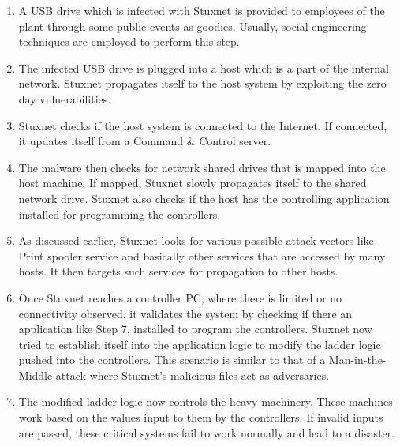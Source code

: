 \documentclass[article,msc=informatik,type=msc,colorback,accentcolor=tud9c]{tudthesis}
\begin{document}
\begin{itemize}
	
	\begin{enumerate}

	

	\item A USB drive which is infected with Stuxnet is provided to employees of the plant through some public events as goodies. Usually, social engineering techniques are employed to perform this step.

	
	\item The infected USB drive is plugged into a host which is a part of the internal network. Stuxnet propagates itself to the host system by exploiting the zero day vulnerabilities.  

	
	\item Stuxnet checks if the host system is connected to the Internet. If connected, it updates itself from a Command \& Control server.

	
	\item The malware then checks for network shared drives that is mapped into the host machine. If mapped, Stuxnet slowly propagates itself to the shared network drive. Stuxnet also checks if the host has the controlling application installed for programming the controllers. 

	

	\item As discussed earlier, Stuxnet looks for various possible attack vectors like Print spooler service and basically other services that are accessed by many hosts. It then targets such services for propagation to other hosts.

	

	\item Once Stuxnet reaches a controller PC, where there is limited or no  connectivity observed, it validates the system by checking if there an application like Step 7, installed to program the controllers. Stuxnet now tried to establish itself into the application logic to modify the ladder logic pushed into the controllers. This scenario is similar to that of a Man-in-the-Middle attack where Stuxnet's malicious files act as adversaries.

	

	\item The modified ladder logic now controls the heavy machinery. These machines work based on the values input to them by the controllers. If invalid inputs are passed, these critical systems fail to work normally and lead to a disaster.

	


\end{enumerate}
\end{itemize}
\end{document}
